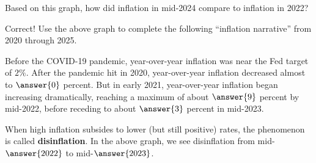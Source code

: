 \documentclass{ximera}
\begin{document}
\begin{question}
\begin{question}
Based on this graph, how did inflation in mid-2024 compare to inflation in 2022?  
\begin{multipleChoice}
\end{multipleChoice}

\begin{question}
Correct!  Use the above graph to complete the following ``inflation narrative'' from 2020 through 2025.  

Before the COVID-19 pandemic, year-over-year inflation was near the Fed target of $2\%$.  After the pandemic hit in 2020, year-over-year inflation decreased almost to $\answer{0}$ percent.  But in early 2021, year-over-year inflation began increasing dramatically, reaching a maximum of about $\answer{9}$ percent by mid-2022, before receding to about $\answer{3}$ percent in mid-2023.  

When high inflation subsides to lower (but still positive) rates, the phenomenon is called \textbf{disinflation}.  In the above graph, we see disinflation from mid-$\answer{2022}$ to mid-$\answer{2023}$.  

\end{question}
\end{question}
\end{question}
\end{document}
